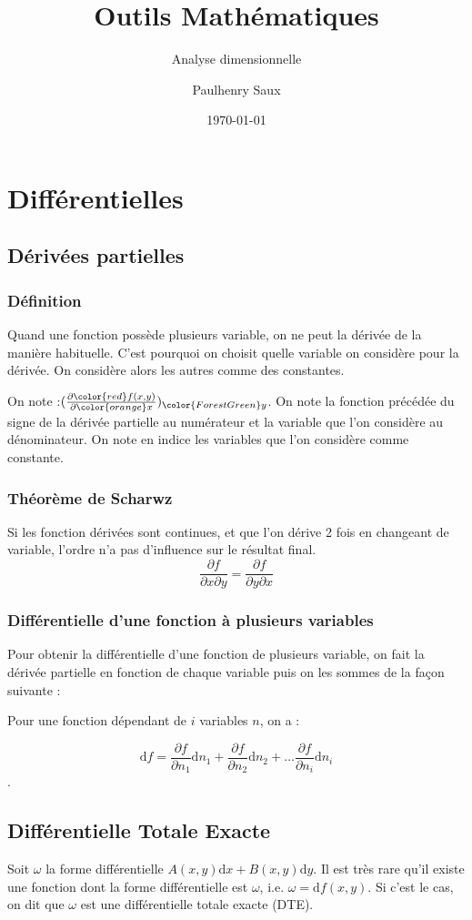 \documentclass[french]{yLectureNote}
\title{Outils Mathématiques}
\subtitle{Analyse dimensionnelle}
\author{Paulhenry Saux}
\date{\today}
\begin{document}
\setcounter{chapter}{6}
\chapter{Différentielles}
\section{Dérivées partielles}
\subsection{Définition}
Quand une fonction possède plusieurs variable, on ne peut la dérivée de la manière habituelle. C'est pourquoi on choisit quelle variable on considère pour la dérivée. On considère alors les autres comme des constantes.

On note :$ (\frac{\partial {\color{red}f(x,y)}}{\partial {\color{orange}x}})_{{\color{ForestGreen}y}}$. On note {\color{red}la fonction} précédée du signe de la dérivée partielle au numérateur et {\color{orange}la variable que l'on considère} au dénominateur. On note en indice {\color{ForestGreen}les variables que l'on considère comme constante}.
\subsection{Théorème de Scharwz}
Si les fonction dérivées sont continues, et que l'on dérive 2 fois en changeant de variable, l'ordre n'a pas d'influence sur le résultat final.
\[\frac{\partial f}{\partial x\partial y} = \frac{\partial f}{\partial y\partial x}\]

\subsection{Différentielle d'une fonction à plusieurs variables}
Pour obtenir la différentielle d'une fonction de plusieurs variable, on fait la dérivée partielle en fonction de chaque variable puis on les sommes de la façon suivante :

Pour une fonction dépendant de $i$ variables $n$, on a :

\[\mathrm{d}f = \frac{\partial f}{\partial n_1} \mathrm{d}n_1 + \frac{\partial f}{\partial n_2} \mathrm{d}n_2 + \dots \frac{\partial f}{\partial n_i} \mathrm{d}n_i\].
\section{Différentielle Totale Exacte}
Soit $\omega$ la forme différentielle $A(x,y)\mathrm{d}x+B(x,y)\mathrm{d}y$. Il est très rare qu'il existe une fonction dont la forme différentielle est $\omega$, i.e. $\omega = \mathrm{d}f(x,y)$. Si c'est le cas, on dit que $\omega$ est une différentielle totale exacte (DTE).
\end{document}
